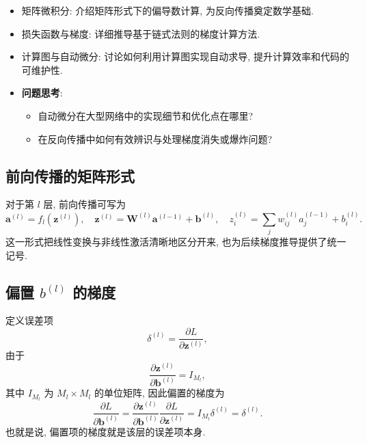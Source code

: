 \documentclass{../nndlcourse}
\begin{document}
\begin{itemize}
    \item 矩阵微积分: 介绍矩阵形式下的偏导数计算, 为反向传播奠定数学基础. 
    \item 损失函数与梯度: 详细推导基于链式法则的梯度计算方法. 
    \item 计算图与自动微分: 讨论如何利用计算图实现自动求导, 提升计算效率和代码的可维护性. 
    \item \textbf{问题思考}: 
    \begin{itemize}
        \item 自动微分在大型网络中的实现细节和优化点在哪里? 
        \item 在反向传播中如何有效辨识与处理梯度消失或爆炸问题? 
    \end{itemize}
\end{itemize}

\subsection{前向传播的矩阵形式}

对于第 $l$ 层, 前向传播可写为
\begin{equation*}
    \boldsymbol{a}^{(l)} = f_l(\boldsymbol{z}^{(l)}), \quad 
    \boldsymbol{z}^{(l)} = \boldsymbol{W}^{(l)}\boldsymbol{a}^{(l-1)} + \boldsymbol{b}^{(l)}, \quad z_i^{(l)} = \sum_j w_{ij}^{(l)}a_j^{(l-1)} + b_i^{(l)}.
\end{equation*}
这一形式把线性变换与非线性激活清晰地区分开来, 也为后续梯度推导提供了统一记号. 

\subsection{偏置 $b^{(l)}$ 的梯度}

定义误差项
\begin{equation*}
    \delta^{(l)} = \frac{\partial L}{\partial \boldsymbol{z}^{(l)}},
\end{equation*}
由于
\begin{equation*}
    \frac{\partial \boldsymbol{z}^{(l)}}{\partial \boldsymbol{b}^{(l)}} = I_{M_l},
\end{equation*}
其中 $I_{M_l}$ 为 $M_l \times M_l$ 的单位矩阵, 因此偏置的梯度为
\begin{equation*}
    \frac{\partial L}{\partial \boldsymbol{b}^{(l)}} = \frac{\partial \boldsymbol{z}^{(l)}}{\partial \boldsymbol{b}^{(l)}} \frac{\partial L}{\partial \boldsymbol{z}^{(l)}} = I_{M_l}\delta^{(l)} = \delta^{(l)}.
\end{equation*}
也就是说, 偏置项的梯度就是该层的误差项本身. 
\end{document}
